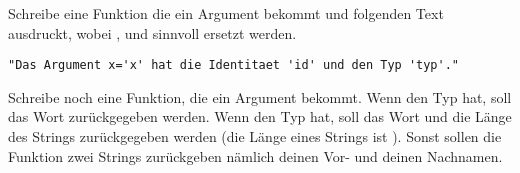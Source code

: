 \begin{aufg}
  Schreibe eine Funktion die ein Argument  bekommt und folgenden Text ausdruckt, 
  wobei ,  und  sinnvoll ersetzt werden.
  \begin{lstlisting}
"Das Argument x='x' hat die Identitaet 'id' und den Typ 'typ'."
  \end{lstlisting}

  Schreibe noch eine Funktion, die ein Argument  bekommt.
  Wenn  den Typ  hat, soll das Wort  zurückgegeben werden.
  Wenn  den Typ  hat, soll das Wort  und die Länge des Strings zurückgegeben werden
  (die Länge eines Strings  ist ).
  Sonst sollen die Funktion zwei Strings zurückgeben nämlich deinen Vor- und deinen Nachnamen.
\end{aufg}
